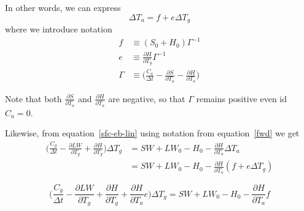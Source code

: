 \documentclass{article}
\newcommand{\pderiv}[2]{\frac{\partial #1}{\partial #2}} %
\newcommand{\incr}[2]{\frac{\partial #1}{\partial #2}\Delta #2} %
\begin{document}
In other words, we can express
\begin{equation}
    \label{fwd}
    \Delta T_a = f + e \Delta T_g
\end{equation}
where we introduce notation
\begin{align}
    f          &\equiv (S_0 + H_0) \Gamma^{-1} \\
    e          &\equiv \pderiv{H}{T_g} \Gamma^{-1} \\
    \Gamma     &\equiv \bigg( \frac{C_a}{\Delta t} - \pderiv{S}{T_a} - \pderiv{H}{T_a} \bigg)
\end{align}

Note that both $\pderiv{S}{T_a}$ and $\pderiv{H}{T_a}$ are negative, so that $\Gamma$
remains positive even id $C_a = 0$.

Likewise, from equation~\eqref{sfc-eb-lin} using notation from
equation~\eqref{fwd} we get
\begin{align}
    \bigg( \frac{C_g}{\Delta t} - \pderiv{LW}{T_g} + \pderiv{H}{T_g} \bigg) \Delta T_g
        & = SW + LW_0 - H_0 - \incr{H}{T_a} \\
        & = SW + LW_0 - H_0 - \pderiv{H}{T_a} \left( f + e \Delta T_g \right)
\end{align}

\begin{equation}
    \bigg( \frac{C_g}{\Delta t} - \pderiv{LW}{T_g} + \pderiv{H}{T_g} + \pderiv{H}{T_a} e \bigg) \Delta T_g
        = SW + LW_0 - H_0 - \pderiv{H}{T_a} f
\end{equation}
\end{document}
